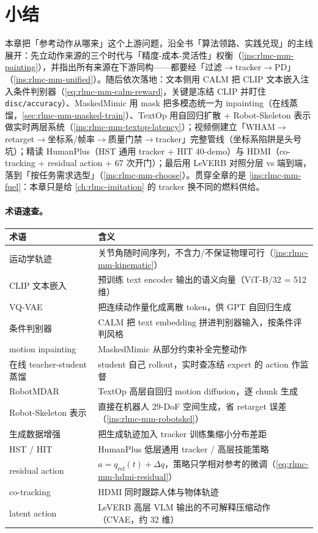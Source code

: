\section*{小结}
\label{sec:rlmc-mm-summary}

本章把「参考动作从哪来」这个上游问题，沿全书「算法领路、实践兑现」的主线展开：先立动作来源的三个时代与「精度-成本-灵活性」权衡（\cref{ins:rlmc-mm-painting}），并指出所有来源在下游同构——都要经「过滤$\to$tracker$\to$PD」（\cref{ins:rlmc-mm-unified}）。随后依次落地：文本侧用 CALM 把 CLIP 文本嵌入注入条件判别器（\cref{eq:rlmc-mm-calm-reward}，关键是冻结 CLIP 并盯住 \verb|disc/accuracy|）、MaskedMimic 用 mask 把多模态统一为 inpainting（在线蒸馏，\cref{sec:rlmc-mm-masked-train}）、TextOp 用自回归扩散 + Robot-Skeleton 表示做实时两层系统（\cref{ins:rlmc-mm-textop-latency}）；视频侧建立「WHAM$\to$retarget$\to$坐标系/帧率$\to$质量门禁$\to$tracker」完整管线（坐标系陷阱是头号坑）；精读 HumanPlus（HST 通用 tracker + HIT 40-demo）与 HDMI（co-tracking + residual action + 67 次开门）；最后用 LeVERB 对照分层 vs 端到端，落到「按任务需求选型」（\cref{ins:rlmc-mm-choose}）。贯穿全章的是 \cref{ins:rlmc-mm-fuel}：本章只是给 \cref{ch:rlmc-imitation} 的 tracker 换不同的燃料供给。

\paragraph{术语速查。}
\begin{center}
\small
\begin{tabular}{@{}ll@{}}
\toprule
术语 & 含义 \\
\midrule
运动学轨迹 & 关节角随时间序列，不含力/不保证物理可行（\cref{ins:rlmc-mm-kinematic}） \\
CLIP 文本嵌入 & 预训练 text encoder 输出的语义向量（ViT-B/32 = 512 维） \\
VQ-VAE & 把连续动作量化成离散 token，供 GPT 自回归生成 \\
条件判别器 & CALM 把 text embedding 拼进判别器输入，按条件评判风格 \\
motion inpainting & MaskedMimic 从部分约束补全完整动作 \\
在线 teacher-student 蒸馏 & student 自己 rollout，实时查冻结 expert 的 action 作监督 \\
RobotMDAR & TextOp 高层自回归 motion diffusion，逐 chunk 生成 \\
Robot-Skeleton 表示 & 直接在机器人 29-DoF 空间生成，省 retarget 误差（\cref{ins:rlmc-mm-robotskel}） \\
生成数据增强 & 把生成轨迹加入 tracker 训练集缩小分布差距 \\
HST / HIT & HumanPlus 低层通用 tracker / 高层技能策略 \\
residual action & $a=q_{\text{ref}}(t)+\Delta q$，策略只学相对参考的微调（\cref{eq:rlmc-mm-hdmi-residual}） \\
co-tracking & HDMI 同时跟踪人体与物体轨迹 \\
latent action & LeVERB 高层 VLM 输出的不可解释压缩动作（CVAE，约 32 维） \\
\bottomrule
\end{tabular}
\end{center}

